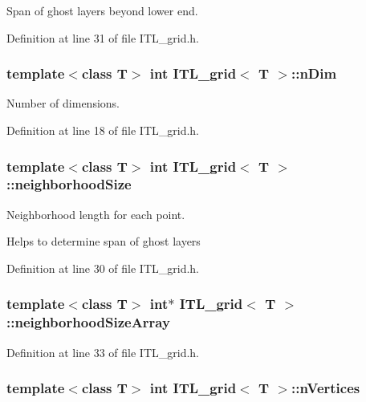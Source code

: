Span of ghost layers beyond lower end. 



Definition at line 31 of file ITL\_\-grid.h.

\hypertarget{classITL__grid_a81b6e8bd7659d7ffaafe0990351a5d22}{
\subsubsection[{nDim}]{\setlength{\rightskip}{0pt plus 5cm}template$<$class T$>$ int {\bf ITL\_\-grid}$<$ T $>$::{\bf nDim}}}
\label{classITL__grid_a81b6e8bd7659d7ffaafe0990351a5d22}


Number of dimensions. 



Definition at line 18 of file ITL\_\-grid.h.

\hypertarget{classITL__grid_ace636892759ad4345c5f7725506ab329}{
\subsubsection[{neighborhoodSize}]{\setlength{\rightskip}{0pt plus 5cm}template$<$class T$>$ int {\bf ITL\_\-grid}$<$ T $>$::{\bf neighborhoodSize}}}
\label{classITL__grid_ace636892759ad4345c5f7725506ab329}


Neighborhood length for each point. 

Helps to determine span of ghost layers 

Definition at line 30 of file ITL\_\-grid.h.

\hypertarget{classITL__grid_a7f48b658a2978a050163c31bdce38524}{
\subsubsection[{neighborhoodSizeArray}]{\setlength{\rightskip}{0pt plus 5cm}template$<$class T$>$ int$\ast$ {\bf ITL\_\-grid}$<$ T $>$::{\bf neighborhoodSizeArray}}}
\label{classITL__grid_a7f48b658a2978a050163c31bdce38524}


Definition at line 33 of file ITL\_\-grid.h.

\hypertarget{classITL__grid_a21d38f7628465b0638ebd60f0fa11e7d}{
\subsubsection[{nVertices}]{\setlength{\rightskip}{0pt plus 5cm}template$<$class T$>$ int {\bf ITL\_\-grid}$<$ T $>$::{\bf nVertices}}}
\label{classITL__grid_a21d38f7628465b0638ebd60f0fa11e7d}


